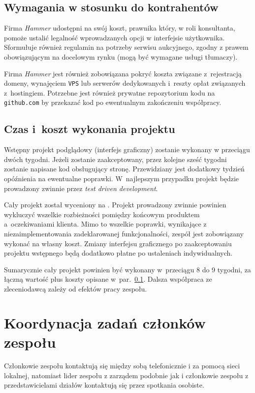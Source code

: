 \documentclass[10pt,a4paper]{article}
\begin{document}
\subsection{Wymagania w stosunku do kontrahentów}
\label{sec:wymagania_od_kontrahenta}
Firma \emph{Hammer} udostępni na swój koszt, prawnika który, w roli
konsultanta, pomoże ustalić legalność wprowadzanych opcji w interfejsie
użytkownika. Sformułuje również regulamin na potrzeby serwisu aukcyjnego,
zgodny z prawem obowiązującym na docelowym rynku (mogą być wymagane usługi
tłumaczy).

Firma \emph{Hammer} jest również zobowiązana pokryć koszta związane
z~rejestracją domeny, wynajęciem \texttt{VPS} lub serwerów dedykowanych
i~reszty opłat związanych z~hostingiem. Potrzebne jest również prywatne
repozytorium kodu na \texttt{github.com} by przekazać kod po ewentualnym
zakończeniu współpracy.

\subsection{Czas i~koszt wykonania projektu}
Wstępny projekt podglądowy (interfejs graficzny) zostanie wykonany w przeciągu
dwóch tygodni. Jeżeli zostanie zaakceptowany, przez kolejne sześć tygodni
zostanie napisane kod obsługujący stronę. Przewidziany jest dodatkowy tydzień
opóźnienia na ewentualne poprawki. W~najlepszym przypadku projekt będzie
prowadzony zwinnie przez \emph{test driven development}.

Cały projekt został wyceniony na . Projekt prowadzony zwinnie
powinien wykluczyć wszelkie rozbieżności pomiędzy końcowym produktem
a~oczekiwaniami klienta. Mimo to wszelkie poprawki, wynikające z
niezaimplementowania zadeklarowanej funkcjonalności, zespół jest zobowiązany
wykonać na własny koszt. Zmiany interfejsu graficznego po zaakceptowaniu
projektu wstępnego będą dodatkowo płatne po ustaleniach indywidualnych.

Sumarycznie cały projekt powinien być wykonany w~przeciągu 8 do 9 tygodni, za
łączną wartość  plus koszty opisane
w~par.~\ref{sec:wymagania_od_kontrahenta}. Dalsza współpraca ze zleceniodawcą
zależy od efektów pracy zespołu.

\section{Koordynacja zadań członków zespołu}
Członkowie zespołu kontaktują się między sobą telefonicznie i za pomocą sieci
lokalnej, natomiast lider zespołu z zarządem podobnie jak i członkowie zespołu
z przedstawicielami działów kontaktują się przez spotkania osobiste.
\end{document}
